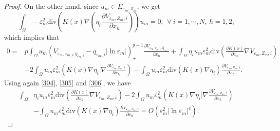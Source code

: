 \documentclass[12pt,reqno]{amsart}
\numberwithin{equation}{section}
\theoremstyle{definition}
\theoremstyle{remark}
\begin{document}
\begin{proof}
On the other hand, since $ u_m\in E_{\varepsilon_m,Z_m} $, we get
\begin{equation*}
\int_{\Omega}-\varepsilon_m^2\text{div}\left( K(x)\nabla \left( \eta_i\frac{\partial V_{\varepsilon_m, Z_{m}, i}}{\partial x_\hbar}\right)\right)  u_m=0,\ \ \forall\ i=1,\cdots,N,\  \hbar=1,2,
\end{equation*}
which implies that
\begin{equation}\label{209}
\begin{split}
0%
=&p\int_{\Omega}u_m\left( V_{\varepsilon_m, z_{m,i}, \hat{q}_{\varepsilon_m,i}}-\hat{q}_{\varepsilon_m,i}|\ln\varepsilon_m|\right)^{p-1}_+\frac{\partial V_{\varepsilon_m, z_{m,i}, \hat{q}_{\varepsilon_m,i}}}{\partial x_\hbar}+\int_{\Omega}\eta_iu_m\varepsilon_m^2\text{div}\left (\frac{\partial K(x)}{\partial x_\hbar}\nabla V_{\varepsilon_m, Z_{m},i}  \right )\\
&-2\int_{\Omega}u_m\varepsilon_m^2\left (K(x)\nabla\eta_i|\nabla   \frac{\partial V_{\varepsilon_m, Z_{m},i}}{\partial x_\hbar}  \right ) -\int_{\Omega}u_m\varepsilon_m^2\text{div}\left (K(x)\nabla   \eta_i  \right )\frac{\partial V_{\varepsilon_m, Z_{m},i}}{\partial x_\hbar}.
\end{split}
\end{equation}
Using again \eqref{304}, \eqref{305} and \eqref{306}, we have
\begin{equation}\label{209-1}
\begin{split}
\int_{\Omega}&\eta_iu_m\varepsilon_m^2\text{div}\left (\frac{\partial K(x)}{\partial x_\hbar}\nabla V_{\varepsilon_m, Z_{m},i}  \right )-2\int_{\Omega}u_m\varepsilon_m^2\left (K(x)\nabla\eta_i|\nabla   \frac{\partial V_{\varepsilon_m, Z_{m},i}}{\partial x_\hbar}  \right ) \\
&-\int_{\Omega}u_m\varepsilon_m^2\text{div}\left (K(x)\nabla   \eta_i  \right )\frac{\partial V_{\varepsilon_m, Z_{m},i}}{\partial x_\hbar}
=O\left( \varepsilon_m^2|\ln\varepsilon_m|^{4}\right).
\end{split}
\end{equation}

\end{proof}
\end{document}
